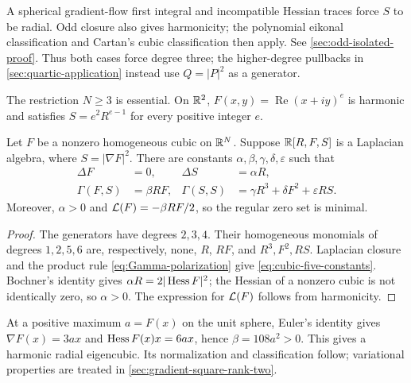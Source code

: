 A spherical gradient-flow first integral and incompatible Hessian
traces force $S$ to be radial. Odd closure also gives harmonicity;
the polynomial eikonal classification \cite[Theorem~1]{TkachevIsoparametric14}
and Cartan's cubic classification \cite{Cartan39} then apply.
See \cref{sec:odd-isolated-proof}.
Thus both cases force degree three; the higher-degree pullbacks in
\cref{sec:quartic-application} instead use \(Q=|P|^2\) as a generator.

The restriction \(N\geq3\) is essential. On \(\mathbb R^2\),
\(F(x,y)=\operatorname{Re}(x+iy)^e\) is harmonic and satisfies
\(S=e^2R^{e-1}\) for every positive integer \(e\).

\begin{lemma}
\label{lem:cubic-gradient-closure}
Let \(F\) be a nonzero homogeneous cubic on \(\mathbb R^N\).  Suppose
\(\mathbb R[R,F,S]\) is a Laplacian algebra, where \(S=|\nabla F|^2\).
There are constants \(\alpha,\beta,\gamma,\delta,\varepsilon\) such that
\begin{equation}\label{eq:cubic-five-constants}
\begin{aligned}
 \Delta F&=0,& \Delta S&=\alpha R,\\
 \Gamma(F,S)&=\beta RF,&
 \Gamma(S,S)&=\gamma R^3+\delta F^2+\varepsilon RS.
\end{aligned}
\end{equation}
Moreover, \(\alpha>0\) and
\(\mathcal L(F)=-\beta RF/2\), so the regular zero set is minimal.
\end{lemma}

\begin{proof}
The generators have degrees \(2,3,4\).  Their homogeneous monomials
of degrees \(1,2,5,6\) are, respectively, none, \(R\), \(RF\), and
\(R^3,F^2,RS\).  Laplacian closure and the product rule
\eqref{eq:Gamma-polarization}
give \eqref{eq:cubic-five-constants}.  Bochner's identity
\cite[Proposition~1.47, equation~(1.236), p.~61]{ColdingMinicozzi11} gives
\(\alpha R=2|\operatorname{Hess} F|^2\); the Hessian of a nonzero cubic is not
identically zero, so \(\alpha>0\).  The expression for \(\mathcal L(F)\)
follows from harmonicity.
\end{proof}

At a positive maximum \(a=F(x)\) on the unit sphere, Euler's
identity gives \(\nabla F(x)=3ax\) and
\(\operatorname{Hess} F(x)x=6ax\), hence \(\beta=108a^2>0\).
This gives a harmonic radial eigencubic. Its normalization and
classification follow; variational properties are treated in
\cref{sec:gradient-square-rank-two}.

